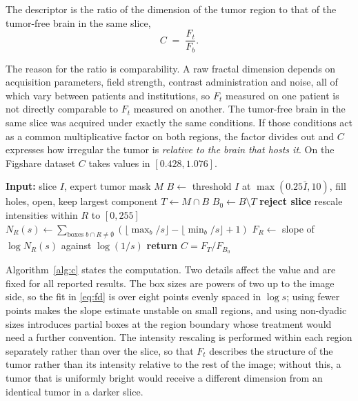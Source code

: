 \documentclass[journal]{IEEEtran}
\begin{document}
The descriptor is the ratio of the dimension of the tumor region to that of the
tumor-free brain in the same slice,
\begin{equation}
C \;=\; \frac{F_t}{F_b}.
\label{eq:C}
\end{equation}

The reason for the ratio is comparability. A raw fractal dimension depends on
acquisition parameters, field strength, contrast administration and noise, all of
which vary between patients and institutions, so $F_t$ measured on one patient is
not directly comparable to $F_t$ measured on another. The tumor-free brain in the
same slice was acquired under exactly the same conditions. If those conditions
act as a common multiplicative factor on both regions, the factor divides out and
$C$ expresses how irregular the tumor is \emph{relative to the brain that hosts
it}. On the Figshare dataset $C$ takes values in $[0.428, 1.076]$.

\begin{algorithm}[t]
\caption{Computation of the tumor-to-brain fractal ratio}
\label{alg:c}
\begin{algorithmic}[1]
\STATE \textbf{Input:} slice $I$, expert tumor mask $M$
\STATE $B \leftarrow$ threshold $I$ at $\max(0.25\bar{I},10)$, fill holes, open, keep largest component
\STATE $T \leftarrow M \cap B$ 
\STATE $B_0 \leftarrow B \setminus T$ 
  \STATE \textbf{reject slice}
\ENDIF
{}
  \STATE rescale intensities within $R$ to $[0,255]$
    \STATE $N_R(s) \leftarrow \sum_{\text{boxes } b \cap R \neq \emptyset}
            \left( \lfloor \max_b / s \rfloor - \lfloor \min_b / s \rfloor + 1 \right)$
  \ENDFOR
  \STATE $F_R \leftarrow$ slope of $\log N_R(s)$ against $\log(1/s)$
\ENDFOR
\STATE \textbf{return} $C = F_T / F_{B_0}$
\end{algorithmic}
\end{algorithm}

Algorithm~\ref{alg:c} states the computation. Two details affect the value and
are fixed for all reported results. The box sizes are powers of two up to the
image side, so the fit in \eqref{eq:fd} is over eight points evenly spaced in
$\log s$; using fewer points makes the slope estimate unstable on small regions,
and using non-dyadic sizes introduces partial boxes at the region boundary whose
treatment would need a further convention. The intensity rescaling is performed
within each region separately rather than over the slice, so that $F_t$ describes
the structure of the tumor rather than its intensity relative to the rest of the
image; without this, a tumor that is uniformly bright would receive a different
dimension from an identical tumor in a darker slice.
\end{document}
